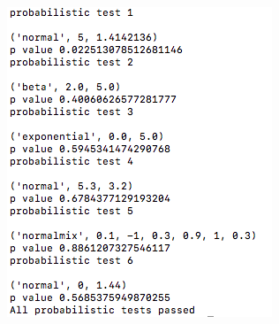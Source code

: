 \documentclass[12pt]{article}%
\theoremstyle{definition}
\begin{document}
\begin{figure}[h]
		\includegraphics[scale=0.6]{prob}
	\end{figure}
	
	
	\newpage
	
\end{document}

